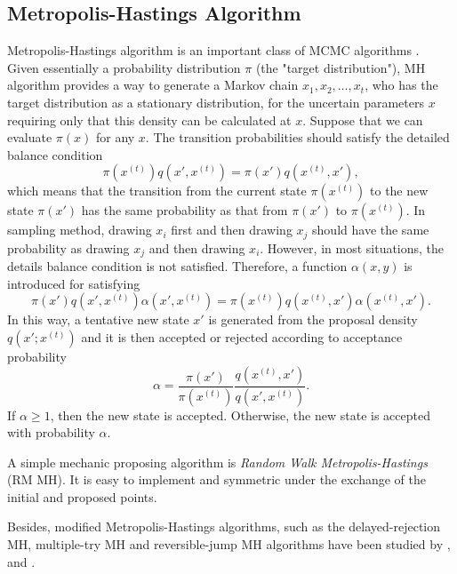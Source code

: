 \subsection*{Metropolis-Hastings Algorithm}

Metropolis-Hastings algorithm is an important class of MCMC algorithms \cite{smith1993bayesian} \cite{tierney1994markov} \cite{gilks1995markov}. Given essentially a probability distribution $\pi$ (the "target distribution"), MH algorithm provides a way to generate a Markov chain $x_1, x_2,\ldots, x_t$, who has the target distribution as a stationary distribution, for the uncertain parameters $x$ requiring only that this density can be calculated at $x$. Suppose that we can evaluate $\pi(x)$ for any $x$. The transition probabilities should satisfy the detailed balance condition
\begin{equation*}
\pi(x^{(t)})q(x', x^{(t)}) = \pi(x')q(x^{(t)}, x'),
\end{equation*}
which means that the transition from the current state $\pi(x^{(t)})$ to the new state $\pi(x')$ has the same probability as that 
from $\pi(x')$ to $\pi(x^{(t)})$. In sampling method, drawing $x_i$ first and then drawing $x_j$ should have the same probability as drawing $x_j$ and then drawing $x_i$. However, in most situations, the details balance condition is not satisfied. Therefore, a function $\alpha(x,y)$ is introduced for satisfying 
\begin{equation*}
\pi(x')q(x', x^{(t)})\alpha(x',x^{(t)}) = \pi(x^{(t)})q(x^{(t)}, x')\alpha(x^{(t)},x').
\end{equation*}
In this way, a tentative new state $x'$ is generated from the proposal density $q(x';x^{(t)})$ and it is then accepted or rejected according to acceptance probability 
\begin{equation}\label{IntroAccp}
\alpha=\frac{\pi(x')}{\pi(x^{(t)})}\frac{q(x^{(t)}, x')}{q(x', x^{(t)})}.
\end{equation}
If $\alpha \geq 1$, then the new state is accepted. Otherwise, the new state is accepted with probability $\alpha$.

A simple mechanic proposing algorithm is \textit{Random Walk Metropolis-Hastings} (RM MH). It is easy to implement and symmetric under the exchange of the initial and proposed points. 

Besides, modified Metropolis-Hastings algorithms, such as the delayed-rejection MH, multiple-try MH and reversible-jump MH algorithms have been studied by \cite{tierney1999some}, \cite{liu2000multiple} and \cite{green1995reversible}. 
 

